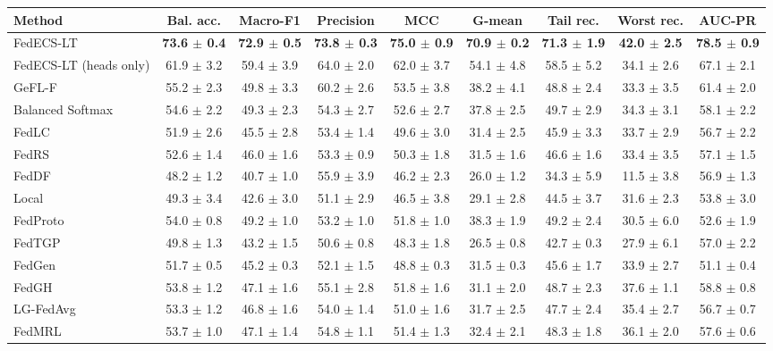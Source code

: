 \begin{tabular}{lcccccccc}
\toprule
Method & Bal. acc. & Macro-F1 & Precision & MCC & G-mean & Tail rec. & Worst rec. & AUC-PR\\
\midrule
FedECS-LT & \textbf{73.6 $\pm$ 0.4} & \textbf{72.9 $\pm$ 0.5} & \textbf{73.8 $\pm$ 0.3} & \textbf{75.0 $\pm$ 0.9} & \textbf{70.9 $\pm$ 0.2} & \textbf{71.3 $\pm$ 1.9} & \textbf{42.0 $\pm$ 2.5} & \textbf{78.5 $\pm$ 0.9}\\
FedECS-LT (heads only) & 61.9 $\pm$ 3.2 & 59.4 $\pm$ 3.9 & 64.0 $\pm$ 2.0 & 62.0 $\pm$ 3.7 & 54.1 $\pm$ 4.8 & 58.5 $\pm$ 5.2 & 34.1 $\pm$ 2.6 & 67.1 $\pm$ 2.1\\
GeFL-F & 55.2 $\pm$ 2.3 & 49.8 $\pm$ 3.3 & 60.2 $\pm$ 2.6 & 53.5 $\pm$ 3.8 & 38.2 $\pm$ 4.1 & 48.8 $\pm$ 2.4 & 33.3 $\pm$ 3.5 & 61.4 $\pm$ 2.0\\
Balanced Softmax & 54.6 $\pm$ 2.2 & 49.3 $\pm$ 2.3 & 54.3 $\pm$ 2.7 & 52.6 $\pm$ 2.7 & 37.8 $\pm$ 2.5 & 49.7 $\pm$ 2.9 & 34.3 $\pm$ 3.1 & 58.1 $\pm$ 2.2\\
FedLC & 51.9 $\pm$ 2.6 & 45.5 $\pm$ 2.8 & 53.4 $\pm$ 1.4 & 49.6 $\pm$ 3.0 & 31.4 $\pm$ 2.5 & 45.9 $\pm$ 3.3 & 33.7 $\pm$ 2.9 & 56.7 $\pm$ 2.2\\
FedRS & 52.6 $\pm$ 1.4 & 46.0 $\pm$ 1.6 & 53.3 $\pm$ 0.9 & 50.3 $\pm$ 1.8 & 31.5 $\pm$ 1.6 & 46.6 $\pm$ 1.6 & 33.4 $\pm$ 3.5 & 57.1 $\pm$ 1.5\\
FedDF & 48.2 $\pm$ 1.2 & 40.7 $\pm$ 1.0 & 55.9 $\pm$ 3.9 & 46.2 $\pm$ 2.3 & 26.0 $\pm$ 1.2 & 34.3 $\pm$ 5.9 & 11.5 $\pm$ 3.8 & 56.9 $\pm$ 1.3\\
Local & 49.3 $\pm$ 3.4 & 42.6 $\pm$ 3.0 & 51.1 $\pm$ 2.9 & 46.5 $\pm$ 3.8 & 29.1 $\pm$ 2.8 & 44.5 $\pm$ 3.7 & 31.6 $\pm$ 2.3 & 53.8 $\pm$ 3.0\\
FedProto & 54.0 $\pm$ 0.8 & 49.2 $\pm$ 1.0 & 53.2 $\pm$ 1.0 & 51.8 $\pm$ 1.0 & 38.3 $\pm$ 1.9 & 49.2 $\pm$ 2.4 & 30.5 $\pm$ 6.0 & 52.6 $\pm$ 1.9\\
FedTGP & 49.8 $\pm$ 1.3 & 43.2 $\pm$ 1.5 & 50.6 $\pm$ 0.8 & 48.3 $\pm$ 1.8 & 26.5 $\pm$ 0.8 & 42.7 $\pm$ 0.3 & 27.9 $\pm$ 6.1 & 57.0 $\pm$ 2.2\\
FedGen & 51.7 $\pm$ 0.5 & 45.2 $\pm$ 0.3 & 52.1 $\pm$ 1.5 & 48.8 $\pm$ 0.3 & 31.5 $\pm$ 0.3 & 45.6 $\pm$ 1.7 & 33.9 $\pm$ 2.7 & 51.1 $\pm$ 0.4\\
FedGH & 53.8 $\pm$ 1.2 & 47.1 $\pm$ 1.6 & 55.1 $\pm$ 2.8 & 51.8 $\pm$ 1.6 & 31.1 $\pm$ 2.0 & 48.7 $\pm$ 2.3 & 37.6 $\pm$ 1.1 & 58.8 $\pm$ 0.8\\
LG-FedAvg & 53.3 $\pm$ 1.2 & 46.8 $\pm$ 1.6 & 54.0 $\pm$ 1.4 & 51.0 $\pm$ 1.6 & 31.7 $\pm$ 2.5 & 47.7 $\pm$ 2.4 & 35.4 $\pm$ 2.7 & 56.7 $\pm$ 0.7\\
FedMRL & 53.7 $\pm$ 1.0 & 47.1 $\pm$ 1.4 & 54.8 $\pm$ 1.1 & 51.4 $\pm$ 1.3 & 32.4 $\pm$ 2.1 & 48.3 $\pm$ 1.8 & 36.1 $\pm$ 2.0 & 57.6 $\pm$ 0.6\\
\bottomrule
\end{tabular}
